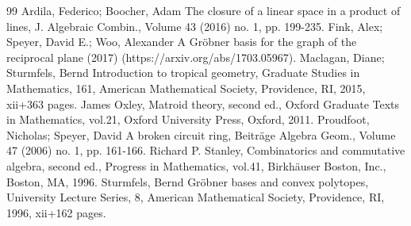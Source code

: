 \begin{thebibliography}{99}
 Ardila, Federico; Boocher, Adam The closure of a linear space in a product of lines, J. Algebraic Combin., Volume 43 (2016) no. 1, pp. 199-235.
 Fink, Alex; Speyer, David E.; Woo, Alexander A Gröbner basis for the graph of the reciprocal plane (2017) (https://arxiv.org/abs/1703.05967).
 Maclagan, Diane; Sturmfels, Bernd Introduction to tropical geometry, Graduate Studies in Mathematics, 161, American Mathematical Society, Providence, RI, 2015, xii+363 pages.
 James Oxley, Matroid theory, second ed., Oxford Graduate Texts in Mathematics, vol.21, Oxford University Press, Oxford, 2011.
 Proudfoot, Nicholas; Speyer, David A broken circuit ring, Beiträge Algebra Geom., Volume 47 (2006) no. 1, pp. 161-166.
 Richard P. Stanley, Combinatorics and commutative algebra, second ed., Progress in Mathematics, vol.41, Birkhäuser Boston, Inc., Boston, MA, 1996.
 Sturmfels, Bernd Gröbner bases and convex polytopes, University Lecture Series, 8, American Mathematical Society, Providence, RI, 1996, xii+162 pages.
\end{thebibliography}
